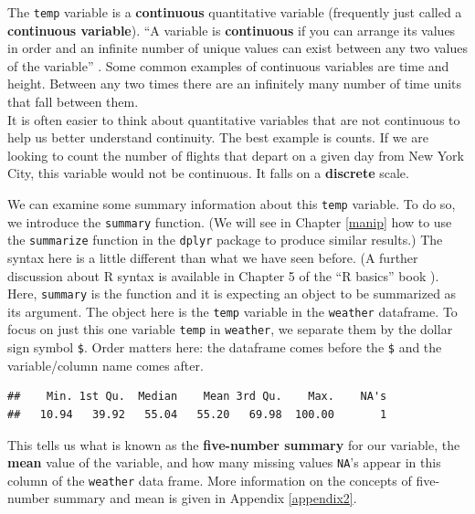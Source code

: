 \documentclass[]{tufte-book}
\newenvironment{Shaded}{\begin{snugshade}}{\end{snugshade}}
\newcommand{\KeywordTok}[1]{\textcolor[rgb]{0.13,0.29,0.53}{\textbf{{#1}}}}
\newcommand{\NormalTok}[1]{{#1}}
\begin{document}
The \texttt{temp} variable is a \textbf{continuous} quantitative
variable (frequently just called a \textbf{continuous variable}). ``A
variable is \textbf{continuous} if you can arrange its values in order
and an infinite number of unique values can exist between any two values
of the variable'' \citep{rds2016}. Some common examples of continuous
variables are time and height. Between any two times there are an
infinitely many number of time units that fall between them.\\
It is often easier to think about quantitative variables that are not
continuous to help us better understand continuity. The best example is
counts. If we are looking to count the number of flights that depart on
a given day from New York City, this variable would not be continuous.
It falls on a \textbf{discrete} scale.

We can examine some summary information about this \texttt{temp}
variable. To do so, we introduce the \texttt{summary} function. (We will
see in Chapter \ref{manip} how to use the \texttt{summarize} function in
the \texttt{dplyr} package to produce similar results.) The syntax here
is a little different than what we have seen before. (A further
discussion about R syntax is available in Chapter 5 of the ``R basics''
book \citep{usedtor2016}). Here, \texttt{summary} is the function and it
is expecting an object to be summarized as its argument. The object here
is the \texttt{temp} variable in the \texttt{weather} dataframe. To
focus on just this one variable \texttt{temp} in \texttt{weather}, we
separate them by the dollar sign symbol \texttt{\$}. Order matters here:
the dataframe comes before the \texttt{\$} and the variable/column name
comes after.

\begin{Shaded}
\end{Shaded}

\begin{verbatim}
##    Min. 1st Qu.  Median    Mean 3rd Qu.    Max.    NA's 
##   10.94   39.92   55.04   55.20   69.98  100.00       1
\end{verbatim}

This tells us what is known as the \textbf{five-number summary} for our
variable, the \textbf{mean} value of the variable, and how many missing
values \texttt{NA}'s appear in this column of the \texttt{weather} data
frame. More information on the concepts of five-number summary and mean
is given in Appendix \ref{appendix2}.
\end{document}
